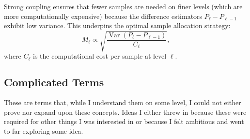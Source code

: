 \documentclass[titlepage]{article}
\begin{document}
\begin{itemize}
    Strong coupling ensures that fewer samples are needed on finer levels (which are more computationally expensive) because the difference estimators \( P_\ell - P_{\ell-1} \) exhibit low variance. This underpins the optimal sample allocation strategy:
    \[
    M_\ell \propto \sqrt{\frac{\operatorname{Var}(P_\ell - P_{\ell-1})}{C_\ell}},
    \]
    where \( C_\ell \) is the computational cost per sample at level \(\ell\).    

\end{itemize}


\subsection{Complicated Terms}
These are terms that, while I understand them on some level, I could not either prove nor expand upon these concepts. Ideas I either threw in because these were required for other things I was interested in or because I felt ambitious and went to far  exploring some idea.
\end{document}
